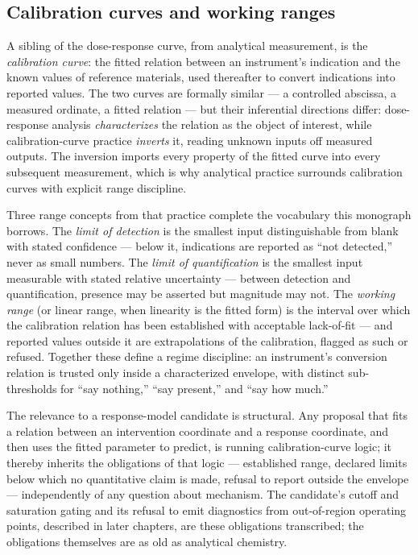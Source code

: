 \subsection{Calibration curves and working ranges}\label{ch02:dose:calibcurve}

A sibling of the dose-response curve, from analytical measurement, is the \emph{calibration curve}: the fitted relation between an instrument's indication and the known values of reference materials, used thereafter to convert indications into reported values. The two curves are formally similar --- a controlled abscissa, a measured ordinate, a fitted relation --- but their inferential directions differ: dose-response analysis \emph{characterizes} the relation as the object of interest, while calibration-curve practice \emph{inverts} it, reading unknown inputs off measured outputs. The inversion imports every property of the fitted curve into every subsequent measurement, which is why analytical practice surrounds calibration curves with explicit range discipline.

Three range concepts from that practice complete the vocabulary this monograph borrows. The \emph{limit of detection} is the smallest input distinguishable from blank with stated confidence --- below it, indications are reported as ``not detected,'' never as small numbers. The \emph{limit of quantification} is the smallest input measurable with stated relative uncertainty --- between detection and quantification, presence may be asserted but magnitude may not. The \emph{working range} (or linear range, when linearity is the fitted form) is the interval over which the calibration relation has been established with acceptable lack-of-fit --- and reported values outside it are extrapolations of the calibration, flagged as such or refused. Together these define a regime discipline: an instrument's conversion relation is trusted only inside a characterized envelope, with distinct sub-thresholds for ``say nothing,'' ``say present,'' and ``say how much.''

The relevance to a response-model candidate is structural. Any proposal that fits a relation between an intervention coordinate and a response coordinate, and then uses the fitted parameter to predict, is running calibration-curve logic; it thereby inherits the obligations of that logic --- established range, declared limits below which no quantitative claim is made, refusal to report outside the envelope --- independently of any question about mechanism. The candidate's cutoff and saturation gating and its refusal to emit diagnostics from out-of-region operating points, described in later chapters, are these obligations transcribed; the obligations themselves are as old as analytical chemistry.


